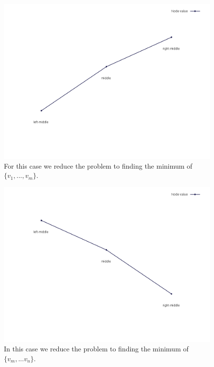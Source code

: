\documentclass[12pt]{article}
\begin{document}
    \begin{figure}[H]
        \centering
        \includegraphics[scale=.35]{mid_case3}
        \caption{For this case we reduce the problem to finding the minimum of $\{v_1, ..., v_{m}\}$.}
    \end{figure}
    \begin{figure}[H]
        \centering
        \includegraphics[scale=.35]{mid_case4}
        \caption{In this case we reduce the problem to finding the minimum of $\{v_m, ...v_n\}$.}
    \end{figure}
\end{document}
